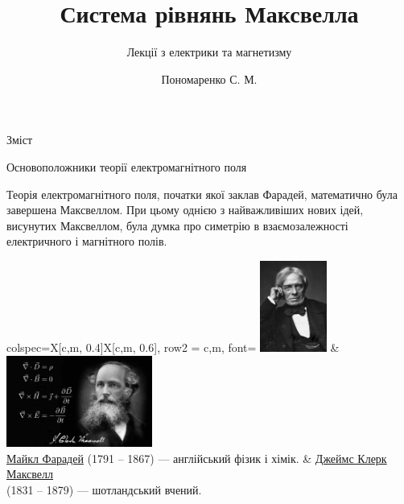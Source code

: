 \documentclass[onlytextwidth]{beamer}
\title[Лекції електрики та магнетизму]{\huge\bfseries Система рівнянь Максвелла}
\subtitle{Лекції з електрики та магнетизму}
\author{Пономаренко С. М.}
\date{}
\begin{document}
\begin{frame}[plain]
	\maketitle
\end{frame}

\begin{frame}{Зміст}{}
	\tableofcontents
\end{frame}




\begin{frame}{Основоположники теорії електромагнітного поля}{}
	\begin{block}{}\justifying
		Теорія електромагнітного поля, початки якої заклав \alert{Фарадей}, математично була завершена \alert{Максвеллом}. При цьому однією з найважливіших
		нових ідей, висунутих Максвеллом, була думка про симетрію в взаємозалежності електричного і магнітного полів.
	\end{block}

	\begin{tblr}{
		colspec={X[c,m, 0.4\linewidth]X[c,m, 0.6\linewidth]},
		row{2} = {c,m, font=\small}
		}
		\includegraphics[height=3cm]{Faraday} & \includegraphics[height=3cm]{james-clerk-maxwell} \\
		\href{https://en.wikipedia.org/wiki/Michael_Faraday}{Майкл Фарадей} (1791 -- 1867) --- англійський фізик і хімік.
		                                                 &
		{\href{https://en.wikipedia.org/wiki/James_Clerk_Maxwell}{Джеймс Клерк Максвелл}\\ (1831 -- 1879) --- шотландський вчений.}
	\end{tblr}
\end{frame}
\end{document}
